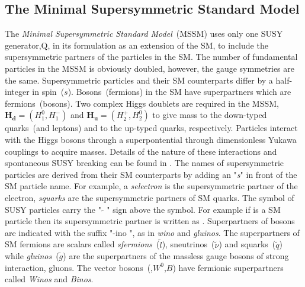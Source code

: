 \subsection{The Minimal Supersymmetric Standard Model}
The \textit{Minimal Supersymmetric Standard Model}~(MSSM) uses only one SUSY generator,$\mathrm{Q}$, in its formulation as an extension of the SM, to include the supersymmetric partners of the particles in the SM. The number of fundamental particles in the MSSM is obviously doubled, however, the gauge symmetries are the same. Supersymmetric particles and their SM counterparts differ by a half-integer in spin~($s$). Bosons~(fermions) in the SM have superpartners which are fermions~(bosons).
\newline
Two complex Higgs doublets are required in the MSSM, $ \mathbf{H_{d}} = (H^{0}_{1},H^{-}_{1})$ and   $ \mathbf{H_{u}} = (H^{+}_{2},H^{0}_{2})$ to give mass to the \textsf{down}-typed quarks~(and leptons) and to the  \textsf{up}-typed quarks, respectively. Particles interact with the Higgs bosons through a superpontential through dimensionless  Yukawa couplings to acquire masses. Details of the nature of these interactions and spontaneous SUSY breaking can be found in \cite{MSSM,SUSYM,SUSYN}.
\newline
The names of supersymmetric particles are derived from their SM counterparts by adding an "\textit{s}" in front of the SM particle name. For example, a \textit{selectron} is the supersymmetric partner of the electron, \textit{squarks} are the supersymmetric partners of SM quarks. The symbol of SUSY particles carry the " $\tilde{}$ " sign above the symbol. For example if \Pquark is a SM particle then  its supersymmetric partner is written as \Psquark. 
Superpartners of bosons are indicated with the suffix "-ino ", as in \textit{wino} and \textit{gluinos}.
\newline
The superpartners of SM fermions are scalars called \textit{sfermions}~($\tilde{l}$), sneutrinos~($\tilde{\nu}$) and squarks~($\tilde{q}$) while \textit{gluinos}~($\tilde{g}$) are the superpartners of the massless gauge bosons of strong interaction, gluons. The vector bosons~(\PWpm,$ W^{0}$,$B$) have fermionic superpartners called \textit{Winos} and \textit{Binos}. 


\vspace{10mm}

